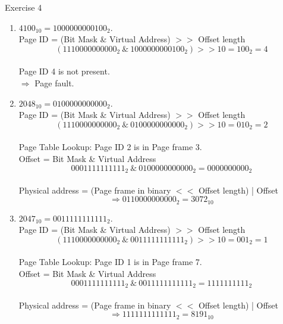 \documentclass[10pt]{beamer}
\begin{document}
\begin{frame}{Exercise 4}
{\begin{enumerate}
 \framebreak
 
 \item
 $4100_{10} = 1000000000100_2$. \\ \vspace{0.4cm}
        Page ID = (Bit Mask \& Virtual Address) $>>$ Offset length
            \[ (1110000000000_2 \ \& \ 1000000000100_2) >> 10 = 100_2 = 4 \] \\
        Page ID 4 is not present. \\ \vspace{0.4cm}
         $\Rightarrow$ Page fault. 
 \framebreak
 
  \item
  $2048_{10} = 0100000000000_2$. \\ \vspace{0.4cm}
        Page ID = (Bit Mask \& Virtual Address) $>>$ Offset length
            \[ (1110000000000_2 \ \& \ 0100000000000_2) >> 10 = 010_2 = 2 \] \\
        Page Table Lookup: Page ID 2 is in Page frame 3. \\ \vspace{0.4cm}
        Offset = Bit Mask \& Virtual Address
            \[0001111111111_2 \ \& \ 0100000000000_2  = 0000000000_2 \] \\
        Physical address = (Page frame in binary $<<$ Offset length) | Offset \\
        \[\Rightarrow 011 0000000000_2 = 3072_{10} \]
 \framebreak
 
  \item 
   $2047_{10} = 0011111111111_2$. \\ \vspace{0.4cm}
        Page ID = (Bit Mask \& Virtual Address) $>>$ Offset length
            \[ (1110000000000_2 \ \& \ 0011111111111_2) >> 10 = 001_2 = 1 \] \\
        Page Table Lookup: Page ID 1 is in Page frame 7. \\ \vspace{0.4cm}
        Offset = Bit Mask \& Virtual Address
            \[0001111111111_2 \ \& \ 0011111111111_2  = 1111111111_2 \] \\
        Physical address = (Page frame in binary $<<$ Offset length) | Offset \\
        \[\Rightarrow 111 1111111111_2  = 8191_{10} \]
 \end{enumerate}
 }
\end{frame}
\end{document}

